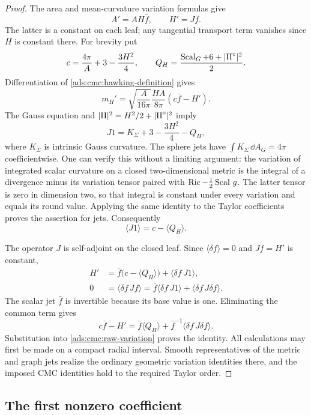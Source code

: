 \begin{proof}
The area and mean-curvature variation formulas give
\[
 A'=AH\bar f,\qquad H'=Jf.
\]
The latter is a constant on each leaf; any tangential transport
term vanishes since \(H\) is constant there.
For brevity put
\[
 c=\frac{4\pi}{A}+3-\frac{3H^2}{4},
 \qquad
 Q_H=\frac{\operatorname{Scal}_G+6+|\mathrm{II}^\circ|^2}{2}.
\]
Differentiation of \eqref{ads:cmc:hawking-definition} gives
\begin{equation}\label{ads:cmc:raw-variation}
 m_H'=\sqrt{\frac A{16\pi}}\frac{HA}{8\pi}
          (c\bar f-H').
\end{equation}
The Gauss equation and
\(|\mathrm{II}|^2=H^2/2+|\mathrm{II}^\circ|^2\) imply
\[
 J1=K_\Sigma+3-\frac{3H^2}{4}-Q_H,
\]
where \(K_\Sigma\) is intrinsic Gauss curvature.
The sphere jets have \(\int K_\Sigma\,\dd A_G=4\pi\)
coefficientwise.
One can verify this without a limiting argument: the variation of
integrated scalar curvature on a closed two-dimensional metric is
the integral of a divergence minus its variation tensor paired with
\(\operatorname{Ric}-\frac12\operatorname{Scal}\,g\).  The latter tensor is zero in dimension
two, so that integral is constant under every variation and equals
its round value.  Applying the same identity to the Taylor
coefficients proves the assertion for jets.
Consequently
\[
 \langle J1\rangle=c-\langle Q_H\rangle.
\]

The operator \(J\) is self-adjoint on the closed leaf.
Since \(\langle\delta f\rangle=0\) and \(Jf=H'\) is constant,
\begin{align*}
 H'&=\bar f\bigl(c-\langle Q_H\rangle\bigr)
                  +\langle\delta f\,J1\rangle,\\
 0&=\langle\delta f\,Jf\rangle
   =\bar f\langle\delta f\,J1\rangle
                  +\langle\delta f\,J\delta f\rangle.
\end{align*}
The scalar jet \(\bar f\) is invertible because its base value is one.
Eliminating the common term gives
\[
 c\bar f-H'
 =\bar f\langle Q_H\rangle
       +\bar f^{-1}\langle\delta f\,J\delta f\rangle.
\]
Substitution into \eqref{ads:cmc:raw-variation} proves the identity.
All calculations may first be made on a compact radial interval.
Smooth representatives of the metric and graph jets realize the
ordinary geometric variation identities there, and the imposed CMC
identities hold to the required Taylor order.
\end{proof}

\subsection{The first nonzero coefficient}

